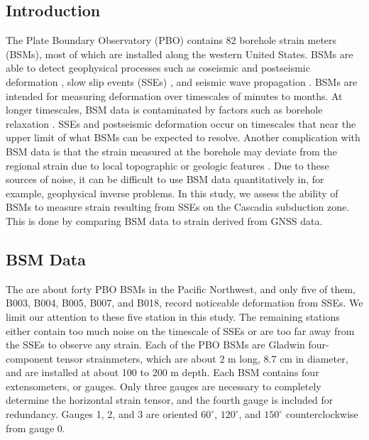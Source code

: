 
\subsection{Introduction}\label{sec:Introduction}
The Plate Boundary Observatory (PBO) contains 82 borehole strain
meters (BSMs), most of which are installed along the western United
States. BSMs are able to detect geophysical processes such as
coseismic and postseismic deformation
\citep[e.g.,][]{Langbein2006,Langbein2015}, slow slip events (SSEs)
\citep[e.g.,][]{Dragert2011}, and seismic wave propagation
\citep{Barbour2017}. BSMs are intended for measuring deformation over
timescales of minutes to months. At longer timescales, BSM data is
contaminated by factors such as borehole relaxation
\citep{Gladwin1987}. SSEs and postseismic deformation occur on
timescales that near the upper limit of what BSMs can be expected to
resolve. Another complication with BSM data is that the strain
measured at the borehole may deviate from the regional strain due to
local topographic or geologic features \citep{Berger1976}. Due to
these sources of noise, it can be difficult to use BSM data
quantitatively in, for example, geophysical inverse problems. In this
study, we assess the ability of BSMs to measure strain resulting from
SSEs on the Cascadia subduction zone. This is done by comparing BSM
data to strain derived from GNSS data.

\subsection{BSM Data}
The are about forty PBO BSMs in the Pacific Northwest, and only five
of them, B003, B004, B005, B007, and B018, record noticeable
deformation from SSEs. We limit our attention to these five station in
this study.  The remaining stations either contain too much noise on
the timescale of SSEs or are too far away from the SSEs to observe any
strain. Each of the PBO BSMs are Gladwin four-component tensor
strainmeters, which are about 2 m long, 8.7 cm in diameter, and are
installed at about 100 to 200 m depth. Each BSM contains four
extensometers, or gauges. Only three gauges are necessary to
completely determine the horizontal strain tensor, and the fourth
gauge is included for redundancy. Gauges 1, 2, and 3 are oriented
$60^\circ$, $120^\circ$, and $150^\circ$ counterclockwise from gauge
0.

